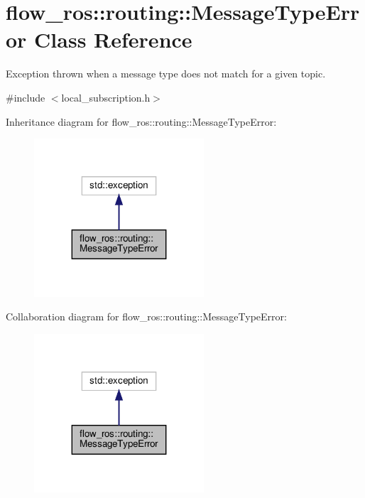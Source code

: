 \hypertarget{classflow__ros_1_1routing_1_1_message_type_error}{}\section{flow\+\_\+ros\+:\+:routing\+:\+:Message\+Type\+Error Class Reference}
\label{classflow__ros_1_1routing_1_1_message_type_error}


Exception thrown when a message type does not match for a given topic.  




{\ttfamily \#include $<$local\+\_\+subscription.\+h$>$}



Inheritance diagram for flow\+\_\+ros\+:\+:routing\+:\+:Message\+Type\+Error\+:\nopagebreak
\begin{figure}[H]
\begin{center}
\leavevmode
\includegraphics[width=179pt]{classflow__ros_1_1routing_1_1_message_type_error__inherit__graph}
\end{center}
\end{figure}


Collaboration diagram for flow\+\_\+ros\+:\+:routing\+:\+:Message\+Type\+Error\+:\nopagebreak
\begin{figure}[H]
\begin{center}
\leavevmode
\includegraphics[width=179pt]{classflow__ros_1_1routing_1_1_message_type_error__coll__graph}
\end{center}
\end{figure}
